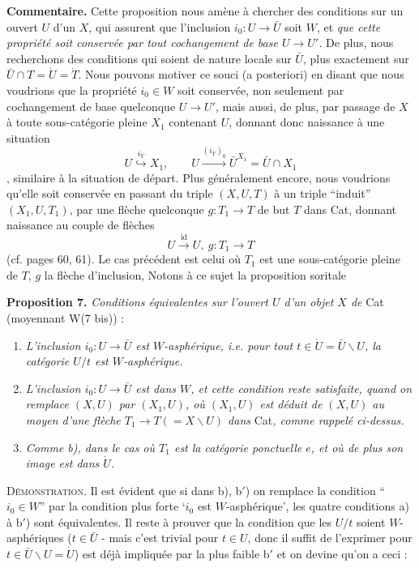 \documentclass[11pt]{article}
\newcommand{\printedpage}[1]{\marginpar{\footnotesize p.~#1}}
\newcommand{\msp}[1]{\marginpar{\footnotesize [#1]}}
\begin{document}
\textbf{Commentaire.} Cette proposition nous amène à chercher des conditions sur un ouvert $U$ d’un $X$, qui assurent que l’inclusion $i_0:U\longrightarrow\bar U$ soit $W$, et \textit{que cette propriété soit conservée par tout cochangement de base $U\longrightarrow U'$.} De plus, nous recherchons des conditions qui soient de nature locale sur $\bar U$, plus exactement sur $\bar U\cap T=\dot U=\dot T$. Nous pouvons motiver ce souci (a posteriori) en disant que nous voudrions que la propriété $i_0\in W$ soit conservée, non seulement par cochangement de base quelconque $U\longrightarrow U'$, mais aussi, de plus, par passage de $X$ à toute sous-catégorie pleine $X_1$ contenant $U$, donnant donc naissance à une situation
\[
U\overset{i_Y}{\hookrightarrow}X_1,\qquad U\xrightarrow{(i_Y)_0}\bar U^{X_1}=\bar U\cap X_1
\]
, similaire à la situation de départ. Plus généralement encore, nous voudrions qu’elle soit conservée en passant du triple $(X,U,T)$ à un triple “induit” $(X_1,U,T_1)$, par une flèche quelconque $g:T_1\longrightarrow T$ de but $T$ dans Cat, donnant naissance au couple de flèches
\[
U\xrightarrow{\mathrm{id}}U,\ g:T_1\longrightarrow T
\]
(cf. pages 60, 61). Le cas précédent est celui où
\printedpage{61}
\msp{page 84}
$T_1$ est une sous-catégorie pleine de $T$, $g$ la flèche d’inclusion, Notons à ce sujet la proposition soritale %

\textbf{Proposition 7.} \textit{Conditions équivalentes sur l’ouvert $U$ d’un objet $X$ de} Cat (moyennant W(7 bis)) :

\begin{enumerate}[label={}, leftmargin=*]
\item[\textit{a)}] \textit{L’inclusion $i_0:U\longrightarrow\bar U$ est $W$-asphérique, i.e. pour tout $t\in\dot U=\bar U\backslash U$, la catégorie $U/t$ est $W$-asphérique.}
\item[\textit{b)}] \textit{L’inclusion $i_0:U\longrightarrow\bar U$ est dans $W$, et cette condition reste satisfaite, quand on remplace $(X,U)$ par $(X_1,U)$, où $(X_1,U)$ est déduit de $(X,U)$ au moyen d’une flèche $T_1\longrightarrow T(=X\backslash U)$ dans} Cat\textit{, comme rappelé ci-dessus.}
\item[\textit{b$'$)}] \textit{Comme b), dans le cas où $T_1$ est la catégorie ponctuelle $e$, et où de plus son image est dans $\dot U$.}
\end{enumerate}

\textsc{Démonstration}. Il est évident que si dans b), b$'$) on remplace la condition “$i_0\in W$” par la condition plus forte ‘$i_0$ est $W$-asphérique’, les quatre conditions a) à b$'$) sont équivalentes. Il reste à prouver que la condition que les $U/t$ soient $W$-asphériques ($t\in\bar U$ - mais c’est trivial pour $t\in U$, donc il suffit de l’exprimer pour $t\in\bar U\backslash U=\dot U$) est déjà impliquée par la plus faible b$'$ et on devine qu’on a ceci :
\end{document}
